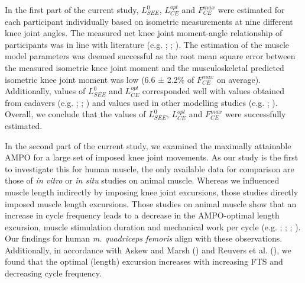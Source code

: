 \documentclass[
  11pt,
  a4paper]{article}
\begin{document}
In the first part of the current study, \(L_{SEE}^0\), \(L_{CE}^{opt}\)
and \(F_{CE}^{max}\) were estimated for each participant individually
based on isometric measurements at nine different knee joint angles. The
measured net knee joint moment-angle relationship of participants was in
line with literature (e.g. ; ; ). The
estimation of the muscle model parameters was deemed successful as the
root mean square error between the measured isometric knee joint moment
and the musculoskeletal predicted isometric knee joint moment was low
(6.6 ± 2.2\% of \(F_{CE}^{max}\) on average). Additionally, values of
\(L_{SEE}^0\) and \(L_{CE}^{opt}\) corresponded well with values
obtained from cadavers (e.g.
;
;
) and
values used in other modelling studies (e.g.
;
).
Overall, we conclude that the values of \(L_{SEE}^0\), \(L_{CE}^{opt}\)
and \(F_{CE}^{max}\) were successfully estimated.

In the second part of the current study, we examined the maximally
attainable AMPO for a large set of imposed knee joint movements. As our
study is the first to investigate this for human muscle, the only
available data for comparison are those of \emph{in vitro} or \emph{in
situ} studies on animal muscle. Whereas we influenced muscle length
indirectly by imposing knee joint excursions, those studies directly
imposed muscle length excursions. Those studies on animal muscle show
that an increase in cycle frequency leads to a decrease in the
AMPO-optimal length excursion, muscle stimulation duration and
mechanical work per cycle (e.g. ; ; ;
). Our
findings for human \emph{m. quadriceps femoris} align with these
observations. Additionally, in accordance with Askew and Marsh
() and Reuvers et al.
(), we found that the
optimal (length) excursion increases with increasing FTS and decreasing
cycle frequency.
\end{document}
